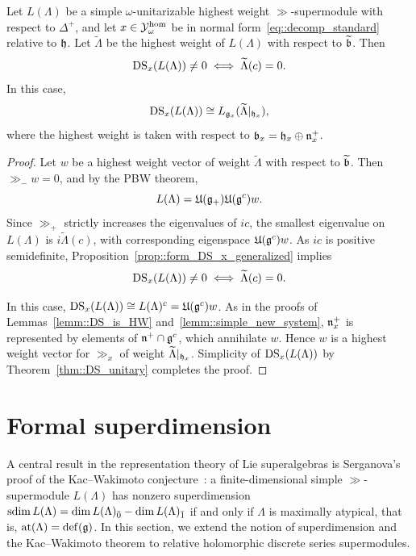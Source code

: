 \begin{proposition}\label{prop::DS_highest_weight_general}
Let $L(\Lambda)$ be a simple $\omega$-unitarizable highest weight $\gg$-supermodule with respect to $\Delta^+$, and let $x\in{\mathcal Y}_\omega^{\hom}$ be in normal form~\eqref{eq::decomp_standard} relative to ${\mathfrak h}$. Let $\widetilde{\Lambda}$ be the highest weight of $L(\Lambda)$ with respect to $\widetilde{{\mathfrak b}}$. Then
\begin{equation*}
\operatorname{DS}_x(L(\Lambda))\neq0
\iff \widetilde{\Lambda}(c)=0.
\end{equation*}
In this case,
\begin{equation*}
\operatorname{DS}_x(L(\Lambda))\cong L_{{\mathfrak{g}}_x}(\widetilde{\Lambda}\vert_{{\mathfrak h}_x}),
\end{equation*}
where the highest weight is taken with respect to ${\mathfrak b}_x={\mathfrak h}_x\oplus{\mathfrak{n}}_x^+$.
\end{proposition}
\begin{proof}

Let $w$ be a highest weight vector of weight $\widetilde{\Lambda}$ with respect to $\widetilde{{\mathfrak b}}$. Then $\gg_-w=0$, and by the PBW theorem,
\begin{equation*}
L(\Lambda)={\mathfrak U}({\mathfrak{g}}_+){\mathfrak U}({\mathfrak{g}}^c)w.
\end{equation*}
Since $\gg_+$ strictly increases the eigenvalues of $ic$, the smallest eigenvalue on $L(\Lambda)$ is $i\widetilde{\Lambda}(c)$, with corresponding eigenspace ${\mathfrak U}({\mathfrak{g}}^c)w$. As $ic$ is positive semidefinite, Proposition~\ref{prop::form_DS_x_generalized} implies
\begin{equation*}
\operatorname{DS}_x(L(\Lambda))\neq0\iff\widetilde{\Lambda}(c)=0.
\end{equation*}

In this case, $\operatorname{DS}_x(L(\Lambda))\cong L(\Lambda)^c={\mathfrak U}({\mathfrak{g}}^c)w$. As in the proofs of Lemmas~\ref{lemm::DS_is_HW} and~\ref{lemm::simple_new_system}, ${\mathfrak{n}}_x^+$ is represented by elements of ${\mathfrak{n}}^+\cap{\mathfrak{g}}^c$, which annihilate $w$. Hence $w$ is a highest weight vector for $\gg_x$ of weight $\widetilde{\Lambda}\vert_{{\mathfrak h}_x}$. Simplicity of $\operatorname{DS}_x(L(\Lambda))$ by Theorem~\ref{thm::DS_unitary} completes the proof.

\end{proof}


\section{Formal superdimension}\label{sec::formal_superdimension}
\noindent
A central result in the representation theory of Lie superalgebras is Serganova's proof of the Kac--Wakimoto conjecture~\cite{serganova2011superdimension}: a finite-dimensional simple $\gg$-supermodule $L(\Lambda)$ has nonzero superdimension
$\operatorname{sdim} L(\Lambda)=\dim L(\Lambda)_{\bar0}-\dim L(\Lambda)_{\bar1}$
if and only if $\Lambda$ is maximally atypical, that is, ${\operatorname{at}}(\Lambda)={\mathrm{def}}({\mathfrak{g}})$. In this section, we extend the notion of superdimension and the Kac--Wakimoto theorem to relative holomorphic discrete series supermodules.


